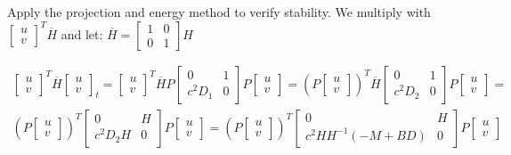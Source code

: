 \documentclass[a4paper]{article}
\begin{document}
Apply the projection and  energy method to verify stability. We multiply with $\begin{bmatrix} u \\ v \end{bmatrix}^{T}\overline{H} $ and let: $\overline{H} = \begin{bmatrix} 1& 0 \\ 0& 1 \end{bmatrix}H $

\begin{equation}
	\begin{aligned}
		\begin{bmatrix} u \\ v \end{bmatrix}^{T}\overline{H}  \begin{bmatrix} u \\ v \end{bmatrix}_t = \begin{bmatrix} u \\ v \end{bmatrix}^{T}\overline{H}  P \begin{bmatrix} 0& 1 \\c^2D_1& 0 \end{bmatrix}P \begin{bmatrix} u \\ v \end{bmatrix}  = \left(P\begin{bmatrix} u \\v \end{bmatrix}\right) ^{T} \overline{H} \begin{bmatrix} 0& 1 \\ c^2D_2& 0 \end{bmatrix} P \begin{bmatrix} u \\ v \end{bmatrix} = \\ 
		\left( P\begin{bmatrix} u \\v \end{bmatrix} \right)^{T} \begin{bmatrix} 0& H \\ c^2D_2H& 0 \end{bmatrix} P \begin{bmatrix} u \\ v \end{bmatrix} =  	\left( P\begin{bmatrix} u \\v \end{bmatrix} \right)^{T} \begin{bmatrix} 0& H \\ c^2HH^{-1}(-M+BD)& 0 \end{bmatrix} P \begin{bmatrix} u \\ v \end{bmatrix}  \\ 

\end{aligned}
\end{equation}
\end{document}
